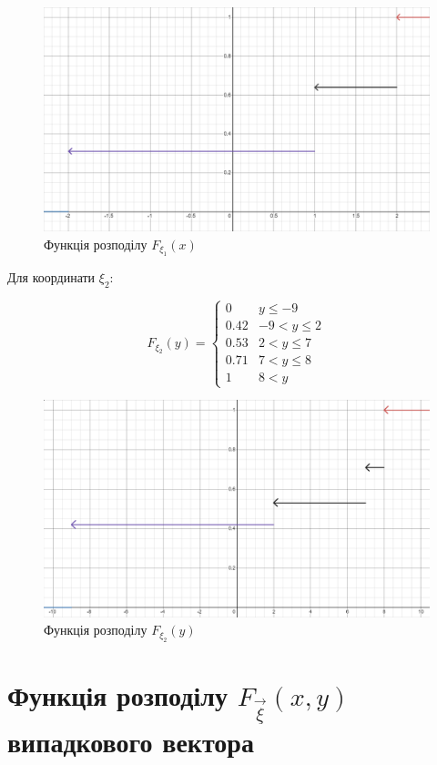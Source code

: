 \documentclass[14pt, a4paper, ukrainian]{extreport}
\begin{document}
	\begin{figure}[H]
		\centering
		\includegraphics[width=\textwidth]{./Image/Im_01_Fx.png}
		\caption{Функція розподілу $F_{\xi_1}(x)$}
		\label{im:Fx}
	\end{figure}

	Для координати $\xi_2$:
	
	$$F_{\xi_2}(y) = \begin{cases}
		0 & y \le -9\\
		0.42 & -9 < y \le 2\\
		0.53 & 2 < y \le 7\\
		0.71 & 7 < y \le 8\\
		1 & 8 < y
	\end{cases}
	$$

	\begin{figure}[H]
		\centering
		\includegraphics[width=\textwidth]{./Image/Im_02_Fy.png}
		\caption{Функція розподілу $F_{\xi_2}(y)$}
		\label{im:Fy}
	\end{figure}
	
	
	\section{Функція розподілу $F_{\vec \xi}(x, y)$ випадкового вектора}
	
\end{document}
